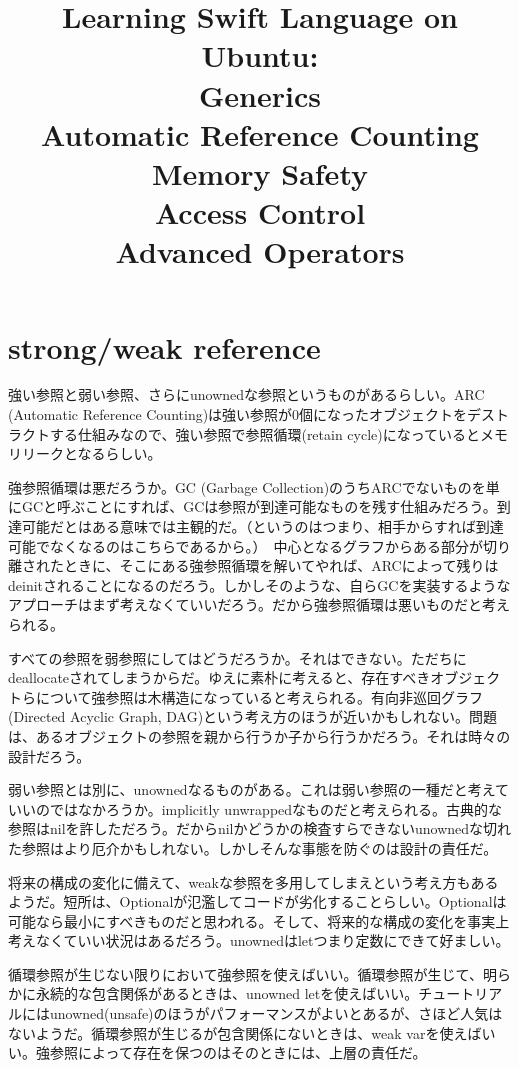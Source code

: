 \documentclass[uplatex,dvipdfmx]{jsarticle} \usepackage{amsmath,amssymb,bm}
\title{Learning Swift Language on Ubuntu:\\Generics\\Automatic Reference Counting\\Memory Safety\\Access Control\\Advanced Operators} \author{} \date{}
\begin{document}
\maketitle


\section*{strong/weak reference}
強い参照と弱い参照、さらにunownedな参照というものがあるらしい。ARC (Automatic Reference Counting)は強い参照が0個になったオブジェクトをデストラクトする仕組みなので、強い参照で参照循環(retain cycle)になっているとメモリリークとなるらしい。

強参照循環は悪だろうか。GC (Garbage Collection)のうちARCでないものを単にGCと呼ぶことにすれば、GCは参照が到達可能なものを残す仕組みだろう。到達可能だとはある意味では主観的だ。（というのはつまり、相手からすれば到達可能でなくなるのはこちらであるから。）　中心となるグラフからある部分が切り離されたときに、そこにある強参照循環を解いてやれば、ARCによって残りはdeinitされることになるのだろう。しかしそのような、自らGCを実装するようなアプローチはまず考えなくていいだろう。だから強参照循環は悪いものだと考えられる。

すべての参照を弱参照にしてはどうだろうか。それはできない。ただちにdeallocateされてしまうからだ。ゆえに素朴に考えると、存在すべきオブジェクトらについて強参照は木構造になっていると考えられる。有向非巡回グラフ(Directed Acyclic Graph, DAG)という考え方のほうが近いかもしれない。問題は、あるオブジェクトの参照を親から行うか子から行うかだろう。それは時々の設計だろう。

弱い参照とは別に、unownedなるものがある。これは弱い参照の一種だと考えていいのではなかろうか。implicitly unwrappedなものだと考えられる。古典的な参照はnilを許しただろう。だからnilかどうかの検査すらできないunownedな切れた参照はより厄介かもしれない。しかしそんな事態を防ぐのは設計の責任だ。

将来の構成の変化に備えて、weakな参照を多用してしまえという考え方もあるようだ。短所は、Optionalが氾濫してコードが劣化することらしい。Optionalは可能なら最小にすべきものだと思われる。そして、将来的な構成の変化を事実上考えなくていい状況はあるだろう。unownedはletつまり定数にできて好ましい。

循環参照が生じない限りにおいて強参照を使えばいい。循環参照が生じて、明らかに永続的な包含関係があるときは、unowned letを使えばいい。チュートリアルにはunowned(unsafe)のほうがパフォーマンスがよいとあるが、さほど人気はないようだ。循環参照が生じるが包含関係にないときは、weak varを使えばいい。強参照によって存在を保つのはそのときには、上層の責任だ。
\end{document}
